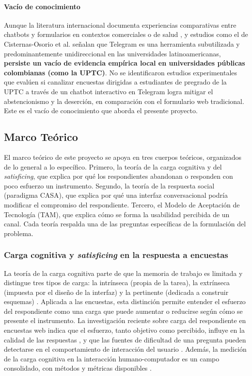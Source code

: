 \documentclass[12pt,letterpaper]{article}
\begin{document}
\paragraph{Vacío de conocimiento}
Aunque la literatura internacional documenta experiencias comparativas entre chatbots y formularios en contextos comerciales o de salud \cite{tepas2020}, y estudios como el de Cisternas-Osorio et al. \cite{cisternas2022} señalan que Telegram es una herramienta subutilizada y predominantemente unidireccional en las universidades latinoamericanas, \textbf{persiste un vacío de evidencia empírica local en universidades públicas colombianas (como la UPTC)}. No se identificaron estudios experimentales que evalúen si canalizar encuestas dirigidas a estudiantes de pregrado de la UPTC a través de un chatbot interactivo en Telegram logra mitigar el abstencionismo y la deserción, en comparación con el formulario web tradicional. Este es el vacío de conocimiento que aborda el presente proyecto.

\subsection{Marco Teórico}

El marco teórico de este proyecto se apoya en tres cuerpos teóricos, organizados de lo general a lo específico. Primero, la teoría de la carga cognitiva y del \textit{satisficing}, que explica por qué los respondientes abandonan o responden con poco esfuerzo un instrumento. Segundo, la teoría de la respuesta social (paradigma CASA), que explica por qué una interfaz conversacional podría modificar el compromiso del respondiente. Tercero, el Modelo de Aceptación de Tecnología (TAM), que explica cómo se forma la usabilidad percibida de un canal. Cada teoría respalda una de las preguntas específicas de la formulación del problema.

\subsubsection{Carga cognitiva y \textit{satisficing} en la respuesta a encuestas}

La teoría de la carga cognitiva parte de que la memoria de trabajo es limitada y distingue tres tipos de carga: la intrínseca (propia de la tarea), la extrínseca (impuesta por el diseño de la interfaz) y la pertinente (dedicada a construir esquemas) \cite{sweller1994}. Aplicada a las encuestas, esta distinción permite entender el esfuerzo del respondiente como una carga que puede aumentar o reducirse según cómo se presente el instrumento. La investigación reciente sobre carga del respondiente en encuestas web indica que el esfuerzo, tanto objetivo como percibido, influye en la calidad de las respuestas \cite{kunz2025}, y que las fuentes de dificultad de una pregunta pueden detectarse en el comportamiento de interacción del usuario \cite{leipold2025}. Además, la medición de la carga cognitiva en la interacción humano-computador es un campo consolidado, con métodos y métricas disponibles \cite{kosch2023}.
\end{document}
